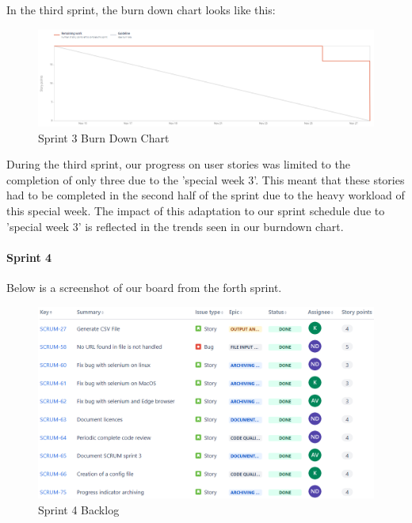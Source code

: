 In the third sprint, the burn down chart looks like this:
\begin{figure}[h!]
    \centering
    \includegraphics[width=1\textwidth]{pictures/Scrum/Sprint 3/Sprint3_burndownchart}
    \caption{Sprint 3 Burn Down Chart}
    \label{fig:sprint_3_bunrdown_chart}
\end{figure}

During the third sprint, our progress on user stories was limited to the completion of only three due to the 'special week 3'.
This meant that these stories had to be completed in the second half of the sprint due to the heavy workload of this special week.
The impact of this adaptation to our sprint schedule due to 'special week 3' is reflected in the trends seen in our burndown chart.
\clearpage

\paragraph{Sprint 4}
Below is a screenshot of our board from the forth sprint.
\begin{figure}[h!]
    \centering
    \includegraphics[width=1\textwidth]{pictures/Scrum/Sprint 4/Sprint4_Backlog}
    \caption{Sprint 4 Backlog}
    \label{fig:sprint_4_backlog}
\end{figure}

